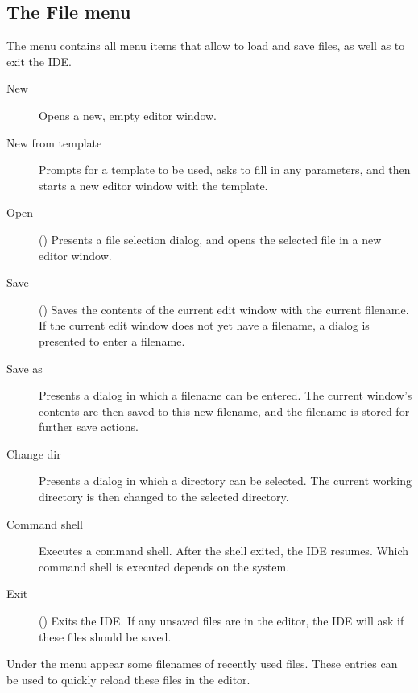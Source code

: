\subsection{The File menu}
\label{se:menufile}
The  menu contains all menu items that allow to load and save
files, as well as to exit the IDE.
\begin{description}
\item[New] Opens a new, empty editor window. 
\item[New from template] Prompts for a template to be used, asks to fill in
any parameters, and then starts a new editor window with the template.
\item[Open] () Presents a file selection dialog, and opens 
the selected file in a new editor window. 
\item[Save] () Saves the contents of the current edit window 
with the current filename. If the current edit window does not yet have
a filename, a dialog is presented to enter a filename.
\item[Save as] Presents a dialog in which a filename can be entered. The
current window's contents are then saved to this new filename, and the
filename is stored for further save actions.
\item[Change dir] Presents a dialog in which a directory can be selected.
The current working directory is then changed to the selected directory.
\item[Command shell] Executes a command shell. After the shell exited, the
IDE resumes. Which command shell is executed depends on the system. 
\item[Exit] () Exits the IDE. If any unsaved files are 
in the editor, the IDE will ask if these files should be saved.
\end{description}
Under the  menu appear some filenames of recently used files.
These entries can be used to quickly reload these files in the editor.

%
%
